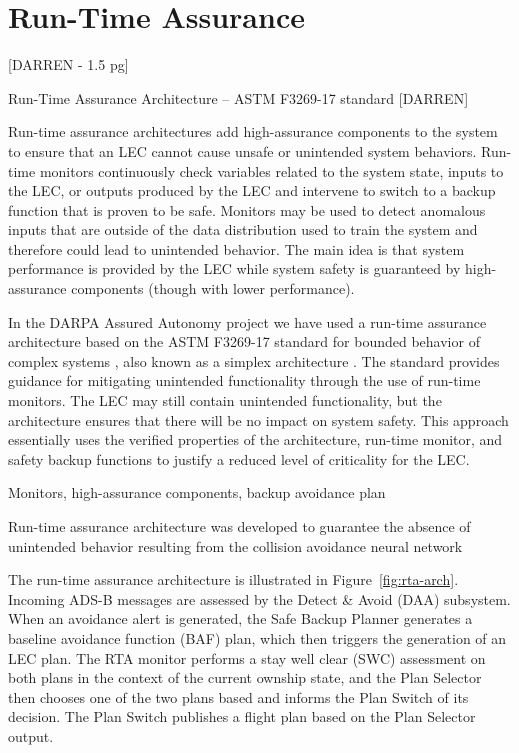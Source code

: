\section{Run-Time Assurance}
\label{sec:rta}

[DARREN - 1.5 pg]

Run-Time Assurance Architecture -- ASTM F3269-17 standard [DARREN]

Run-time assurance architectures add high-assurance components
to the system to ensure that an LEC cannot cause
unsafe or unintended system behaviors. Run-time monitors
continuously check variables related to the system state, inputs
to the LEC, or outputs produced by the LEC and intervene to
switch to a backup function that is proven to be safe. Monitors
may be used to detect anomalous inputs that are outside of the
data distribution used to train the system and therefore could
lead to unintended behavior. The main idea is that system
performance is provided by the LEC while system safety is
guaranteed by high-assurance components (though with lower
performance).

In the DARPA Assured Autonomy project we have used a
run-time assurance architecture based on the ASTM F3269-17
standard for bounded behavior of complex systems \cite{F3269-17}, also
known as a simplex architecture \cite{simplex}. The standard provides
guidance for mitigating unintended functionality through the
use of run-time monitors. The LEC may still contain unintended
functionality, but the architecture ensures that there will
be no impact on system safety. This approach essentially uses
the verified properties of the architecture, run-time monitor,
and safety backup functions to justify a reduced level of
criticality for the LEC.

Monitors, high-assurance components, backup avoidance plan

Run-time assurance architecture was developed to guarantee the absence of unintended behavior resulting from the collision avoidance neural network


The run-time assurance architecture is illustrated in Figure~\ref{fig:rta-arch}.  Incoming ADS-B messages are assessed by the Detect \& Avoid (DAA) subsystem.  When an avoidance alert is generated, the Safe Backup Planner generates a baseline avoidance function (BAF) plan, which then triggers the generation of an LEC plan.  The RTA monitor performs a stay well clear (SWC) assessment on both plans in the context of the current ownship state, and the Plan Selector then chooses one of the two plans based and informs the Plan Switch of its decision.
The Plan Switch publishes a flight plan based on the Plan Selector output.


